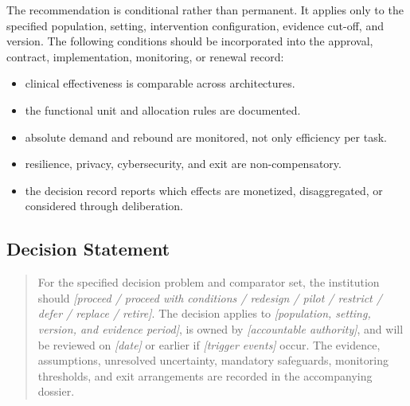 The recommendation is conditional rather than permanent. It applies only to the
specified population, setting, intervention configuration, evidence cut-off, and
version. The following conditions should be incorporated into the approval,
contract, implementation, monitoring, or renewal record:

\begin{itemize}
 \item clinical effectiveness is comparable across architectures.
 \item the functional unit and allocation rules are documented.
 \item absolute demand and rebound are monitored, not only efficiency per task.
 \item resilience, privacy, cybersecurity, and exit are non-compensatory.
 \item the decision record reports which effects are monetized, disaggregated, or considered through deliberation.
\end{itemize}

\subsection{Decision Statement}
\begin{quote}
For the specified decision problem and comparator set, the institution should
\emph{[proceed / proceed with conditions / redesign / pilot / restrict / defer /
replace / retire]}. The decision applies to \emph{[population, setting, version,
and evidence period]}, is owned by \emph{[accountable authority]}, and will be
reviewed on \emph{[date]} or earlier if \emph{[trigger events]} occur. The
evidence, assumptions, unresolved uncertainty, mandatory safeguards, monitoring
thresholds, and exit arrangements are recorded in the accompanying dossier.
\end{quote}
